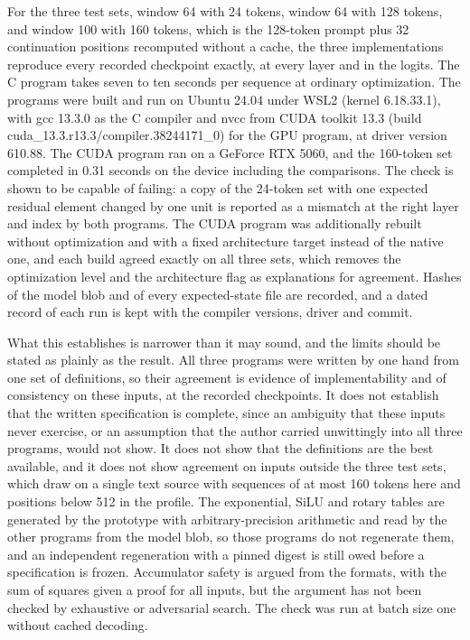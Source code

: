 \documentclass[11pt]{article}
\begin{document}
For the three test sets, window 64 with 24 tokens, window 64 with 128 tokens, and window 100 with 160 tokens, which is the 128-token prompt plus 32 continuation positions recomputed without a cache, the three implementations reproduce every recorded checkpoint exactly, at every layer and in the logits. The C program takes seven to ten seconds per sequence at ordinary optimization. The programs were built and run on Ubuntu 24.04 under WSL2 (kernel 6.18.33.1), with gcc 13.3.0 as the C compiler and nvcc from CUDA toolkit 13.3 (build cuda\_13.3.r13.3/compiler.38244171\_0) for the GPU program, at driver version 610.88. The CUDA program ran on a GeForce RTX 5060, and the 160-token set completed in 0.31 seconds on the device including the comparisons. The check is shown to be capable of failing: a copy of the 24-token set with one expected residual element changed by one unit is reported as a mismatch at the right layer and index by both programs. The CUDA program was additionally rebuilt without optimization and with a fixed architecture target instead of the native one, and each build agreed exactly on all three sets, which removes the optimization level and the architecture flag as explanations for agreement. Hashes of the model blob and of every expected-state file are recorded, and a dated record of each run is kept with the compiler versions, driver and commit.

What this establishes is narrower than it may sound, and the limits should be stated as plainly as the result. All three programs were written by one hand from one set of definitions, so their agreement is evidence of implementability and of consistency on these inputs, at the recorded checkpoints. It does not establish that the written specification is complete, since an ambiguity that these inputs never exercise, or an assumption that the author carried unwittingly into all three programs, would not show. It does not show that the definitions are the best available, and it does not show agreement on inputs outside the three test sets, which draw on a single text source with sequences of at most 160 tokens here and positions below 512 in the profile. The exponential, SiLU and rotary tables are generated by the prototype with arbitrary-precision arithmetic and read by the other programs from the model blob, so those programs do not regenerate them, and an independent regeneration with a pinned digest is still owed before a specification is frozen. Accumulator safety is argued from the formats, with the sum of squares given a proof for all inputs, but the argument has not been checked by exhaustive or adversarial search. The check was run at batch size one without cached decoding.
\end{document}
